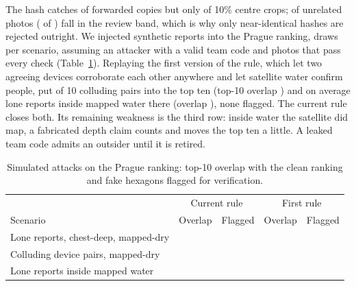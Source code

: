 \documentclass[conference]{IEEEtran}
\begin{document}
The hash catches \trustForwarded{} of \trustSample{} forwarded copies but only \trustCropped{} of 10\% centre crops; \trustBandShare{} of unrelated photos (\trustBandN{} of \trustEufloodN{}) fall in the review band, which is why only near-identical hashes are rejected outright. We injected synthetic reports into the Prague ranking, \atkDraws{} draws per scenario, assuming an attacker with a valid team code and photos that pass every check (Table~\ref{tab:attack}). Replaying the first version of the rule, which let two agreeing devices corroborate each other anywhere and let satellite water confirm people, put \permColludeInTop{} of 10 colluding pairs into the top ten (top-10 overlap \permColludeOverlap{}) and on average \permWetInTop{} lone reports inside mapped water there (overlap \permWetOverlap{}), none flagged. The current rule closes both. Its remaining weakness is the third row: inside water the satellite did map, a fabricated depth claim counts and moves the top ten a little. A leaked team code admits an outsider until it is retired.

\begin{table}[t]
\caption{Simulated attacks on the Prague ranking: top-10 overlap with the clean ranking and fake hexagons flagged for verification.}
\label{tab:attack}
\centering\scriptsize
\begin{tabular}{@{}p{38mm}rrrr@{}}
\toprule
 & \multicolumn{2}{c}{Current rule} & \multicolumn{2}{c}{First rule} \\
Scenario & Overlap & Flagged & Overlap & Flagged \\
\midrule
Lone reports, chest-deep, mapped-dry & \atkLoneOverlap{} & \atkLoneFlagged{} & \permLoneOverlap{} & \permLoneFlagged{} \\
Colluding device pairs, mapped-dry & \atkColludeOverlap{} & \atkColludeFlagged{} & \permColludeOverlap{} & \permColludeFlagged{} \\
Lone reports inside mapped water & \atkWetOverlap{} & \atkWetFlagged{} & \permWetOverlap{} & \permWetFlagged{} \\
\bottomrule
\end{tabular}
\end{table}
\end{document}
